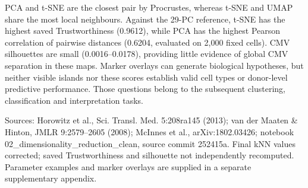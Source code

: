 PCA and t-SNE are the closest pair by Procrustes, whereas t-SNE and UMAP share the most local neighbours. Against the 29-PC reference, t-SNE has the highest saved Trustworthiness (0.9612), while PCA has the highest Pearson correlation of pairwise distances (0.6204, evaluated on 2,000 fixed cells). CMV silhouettes are small (0.0016--0.0178), providing little evidence of global CMV separation in these maps. Marker overlays can generate biological hypotheses, but neither visible islands nor these scores establish valid cell types or donor-level predictive performance. Those questions belong to the subsequent clustering, classification and interpretation tasks.

{\scriptsize Sources: Horowitz et al., Sci. Transl. Med. 5:208ra145 (2013); van der Maaten \& Hinton, JMLR 9:2579--2605 (2008); McInnes et al., arXiv:1802.03426; notebook 02\_dimensionality\_reduction\_clean, source commit 252415a. Final kNN values corrected; saved Trustworthiness and silhouette not independently recomputed. Parameter examples and marker overlays are supplied in a separate supplementary appendix.}
\endgroup
